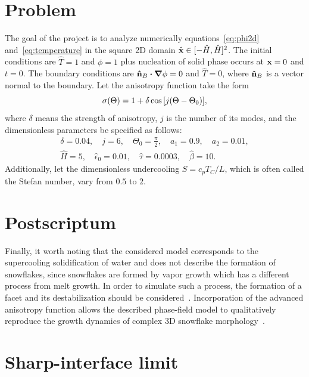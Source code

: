 \documentclass{article}
\begin{document}
\section{Problem}

The goal of the project is to analyze numerically equations~\eqref{eq:phi2d} and~\eqref{eq:temperature}
in the square 2D domain $\hat{\vb{x}}\in[-\hat{H},\hat{H}]^2$.
The initial conditions are $\hat{T}=1$ and $\phi=1$ plus nucleation of solid phase occurs at $\vb{x}=0$ and $t=0$.
The boundary conditions are $\vu{n}_B\vdot\grad\phi=0$ and $\hat{T}=0$,
where $\vu{n}_B$ is a vector normal to the boundary.
Let the anisotropy function take the form
\begin{equation}\label{eq:sigma}
    \sigma(\Theta) = 1 + \delta\cos\qty[j(\Theta-\Theta_0)],
\end{equation}
where $\delta$ means the strength of anisotropy, $j$ is the number of its modes,
and the dimensionless parameters be specified as follows:
\begin{equation}\label{eq:parameters}
    \begin{gathered}
    \delta=0.04, \quad j=6, \quad \Theta_0=\frac{\pi}2, \quad a_1=0.9, \quad a_2 = 0.01, \\
    \hat{H} = 5, \quad \hat{\epsilon}_0 = 0.01, \quad \hat{\tau} = 0.0003, \quad \hat{\beta} = 10.
    \end{gathered}
\end{equation}
Additionally, let the dimensionless undercooling $S = c_p T_C/L$,
which is often called the Stefan number, vary from $0.5$ to $2$.

\section{Postscriptum}

Finally, it worth noting that the considered model corresponds to the supercooling solidification of water
and does not describe the formation of snowflakes,
since snowflakes are formed by vapor growth which has a different process from melt growth.
In order to simulate such a process, the formation of a facet
and its destabilization should be considered~\cite{yokoyama1990pattern}.
Incorporation of the advanced anisotropy function allows the described phase-field model
to qualitatively reproduce the growth dynamics of complex 3D snowflake morphology~\cite{demange2017phase}.

\appendix

\section{Sharp-interface limit}
\end{document}
